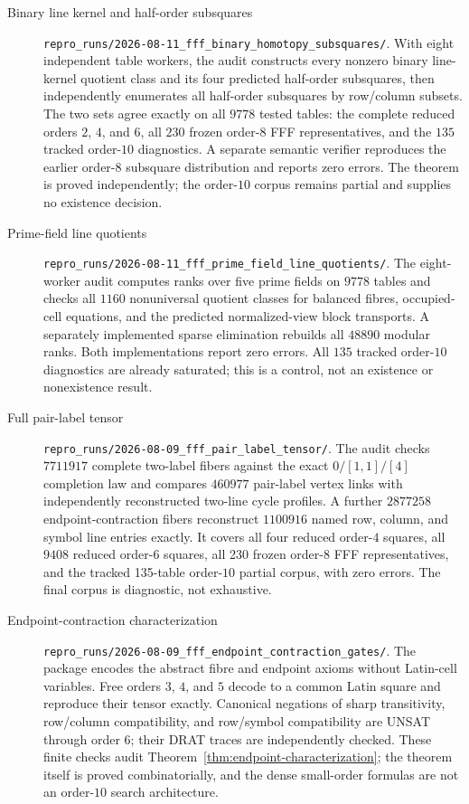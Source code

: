 \begin{description}
\item[Binary line kernel and half-order subsquares]
\nolinkurl{repro_runs/2026-08-11_fff_binary_homotopy_subsquares/}.
With eight independent table workers, the audit constructs every nonzero
binary line-kernel quotient class and its four predicted half-order
subsquares, then independently enumerates all half-order subsquares by
row/column subsets.  The two sets agree exactly on all $9778$ tested tables:
the complete reduced orders $2$, $4$, and $6$, all $230$ frozen order-$8$
FFF representatives, and the $135$ tracked order-$10$ diagnostics.  A
separate semantic verifier reproduces the earlier order-$8$ subsquare
distribution and reports zero errors.  The theorem is proved independently;
the order-$10$ corpus remains partial and supplies no existence decision.

\item[Prime-field line quotients]
\nolinkurl{repro_runs/2026-08-11_fff_prime_field_line_quotients/}.
The eight-worker audit computes ranks over five prime fields on $9778$
tables and checks all $1160$ nonuniversal quotient classes for balanced
fibres, occupied-cell equations, and the predicted normalized-view block
transports.  A separately implemented sparse elimination rebuilds all
$48890$ modular ranks.  Both implementations report zero errors.  All $135$
tracked order-$10$ diagnostics are already saturated; this is a control, not
an existence or nonexistence result.

\item[Full pair-label tensor]
\nolinkurl{repro_runs/2026-08-09_fff_pair_label_tensor/}.
The audit checks $7711917$ complete two-label fibers against the exact
$0/[1,1]/[4]$ completion law and compares $460977$ pair-label vertex links
with independently reconstructed two-line cycle profiles.  A further
$2877258$ endpoint-contraction fibers reconstruct $1100916$ named row,
column, and symbol line entries exactly.  It covers all
four reduced order-$4$ squares, all $9408$ reduced order-$6$ squares, all
230 frozen order-$8$ FFF representatives, and the tracked 135-table
order-$10$ partial corpus, with zero errors.  The final corpus is diagnostic,
not exhaustive.

\item[Endpoint-contraction characterization]
\nolinkurl{repro_runs/2026-08-09_fff_endpoint_contraction_gates/}.
The package encodes the abstract fibre and endpoint axioms without Latin-cell
variables.  Free orders $3$, $4$, and $5$ decode to a common Latin square and
reproduce their tensor exactly.  Canonical negations of sharp transitivity,
row/column compatibility, and row/symbol compatibility are UNSAT through
order $6$; their DRAT traces are independently checked.  These finite checks
audit Theorem~\ref{thm:endpoint-characterization}; the theorem itself is
proved combinatorially, and the dense small-order formulas are not an
order-$10$ search architecture.


\end{description}
